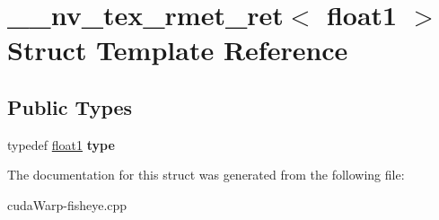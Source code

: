 \hypertarget{struct____nv__tex__rmet__ret_3_01float1_01_4}{}\section{\+\_\+\+\_\+nv\+\_\+tex\+\_\+rmet\+\_\+ret$<$ float1 $>$ Struct Template Reference}
\label{struct____nv__tex__rmet__ret_3_01float1_01_4}
\subsection*{Public Types}
\begin{DoxyCompactItemize}
\item 
typedef \hyperlink{structfloat1}{float1} {\bfseries type}\hypertarget{struct____nv__tex__rmet__ret_3_01float1_01_4_ad7c0471dc6542c7efda5bef1a8d2bb57}{}\label{struct____nv__tex__rmet__ret_3_01float1_01_4_ad7c0471dc6542c7efda5bef1a8d2bb57}

\end{DoxyCompactItemize}


The documentation for this struct was generated from the following file\+:\begin{DoxyCompactItemize}
\item 
cuda\+Warp-\/fisheye.\+cpp\end{DoxyCompactItemize}
